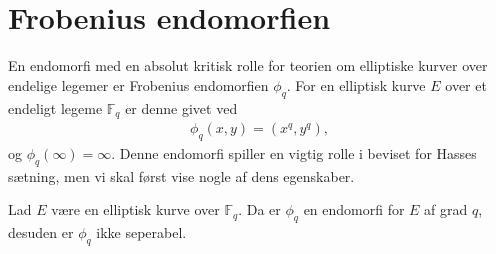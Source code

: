 \section{Frobenius endomorfien}

En endomorfi med en absolut kritisk rolle for teorien om elliptiske kurver over endelige legemer er Frobenius endomorfien $\phi_q$. For en elliptisk kurve $E$ over et endeligt legeme $\mathbb{F}_q$ er denne givet ved
\begin{align}
	\phi_q (x, y) = (x^q, y^q),
\end{align}
og $\phi_q(\infty) = \infty$.
Denne endomorfi spiller en vigtig rolle i beviset for Hasses sætning, men vi skal først vise nogle af dens egenskaber.

\begin{lemma}
\label{lemma_end_degree_not_sep}
Lad $E$ være en elliptisk kurve over $\mathbb{F}_q$. Da er $\phi_q$ en 
endomorfi for $E$ af grad $q$, desuden er $\phi_q$ ikke seperabel.
\end{lemma}
